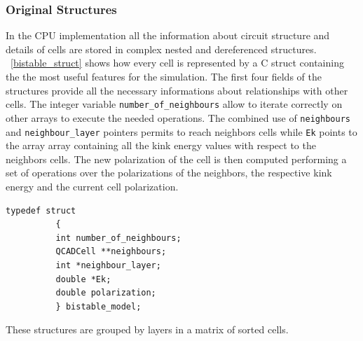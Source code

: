 \subsubsection{Original Structures}
In the CPU implementation all the information about circuit structure and details of cells are stored in complex nested and dereferenced
 structures. \lstlistingname~\ref{bistable_struct} shows how every cell is represented by a C struct containing the the most useful 
features for the simulation.
The first four fields of the structures provide all the necessary informations about relationships with other cells. The integer variable 
\texttt{number\_of\_neighbours} allow to iterate correctly on other arrays to execute the needed operations.
The combined use of \texttt{neighbours} and \texttt{neighbour\_layer} pointers permits to reach neighbors cells while \texttt{Ek} points
to the array array containing all the kink energy values with respect to the neighbors cells.\newline
The new polarization of the cell is then computed performing a set of operations over the polarizations of the neighbors, the respective 
kink energy and the current cell polarization.\newline
\begin{lstlisting}[caption=Bistable model structure for the QCACDell, label=bistable_struct]
	    typedef struct
	      {
	      int number_of_neighbours;
	      QCADCell **neighbours;
	      int *neighbour_layer;
	      double *Ek;
	      double polarization;
	      } bistable_model;
\end{lstlisting}
These structures are grouped by layers in a matrix of sorted cells.

